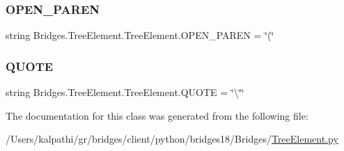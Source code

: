 \subsubsection{\texorpdfstring{O\+P\+E\+N\+\_\+\+P\+A\+R\+EN}{OPEN\_PAREN}}
{\footnotesize\ttfamily string Bridges.\+Tree\+Element.\+Tree\+Element.\+O\+P\+E\+N\+\_\+\+P\+A\+R\+EN = \char`\"{}(\char`\"{}\hspace{0.3cm}{\ttfamily [static]}}

\mbox{\label{class_bridges_1_1_tree_element_1_1_tree_element_a9c4b0517bdd82b0f000c818ced4733c3}} 
\subsubsection{\texorpdfstring{Q\+U\+O\+TE}{QUOTE}}
{\footnotesize\ttfamily string Bridges.\+Tree\+Element.\+Tree\+Element.\+Q\+U\+O\+TE = \char`\"{}\textbackslash{}\char`\"{}\char`\"{}\hspace{0.3cm}{\ttfamily [static]}}



The documentation for this class was generated from the following file\+:\begin{DoxyCompactItemize}
\item 
/\+Users/kalpathi/gr/bridges/client/python/bridges18/\+Bridges/\mbox{\hyperlink{_tree_element_8py}{Tree\+Element.\+py}}\end{DoxyCompactItemize}
